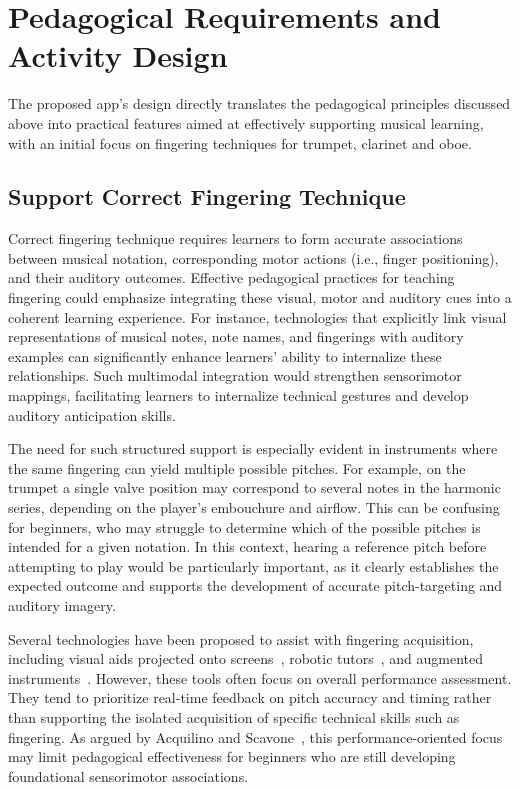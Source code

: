 \documentclass[runningheads]{llncs}
\begin{document}
\section{Pedagogical Requirements and Activity Design}
\label{sec:during}

The proposed app’s design directly translates the pedagogical principles discussed above into practical features aimed at effectively supporting musical learning, with an initial focus on fingering techniques for trumpet, clarinet and oboe.


\subsection{Support Correct Fingering Technique}
\label{sec:fingering}

Correct fingering technique requires learners to form accurate associations between musical notation, corresponding motor actions (i.e., finger positioning), and their auditory outcomes. Effective pedagogical practices for teaching fingering could emphasize integrating these visual, motor and auditory cues into a coherent learning experience.
For instance, technologies that explicitly link visual representations of musical notes, note names, and fingerings with auditory examples can significantly enhance learners’ ability to internalize these relationships. Such multimodal integration would strengthen sensorimotor mappings, facilitating learners to internalize technical gestures and develop auditory anticipation skills.

The need for such structured support is especially evident in instruments where the same fingering can yield multiple possible pitches. For example, on the trumpet a single valve position may correspond to several notes in the harmonic series, depending on the player’s embouchure and airflow. This can be confusing for beginners, who may struggle to determine which of the possible pitches is intended for a given notation. In this context, hearing a reference pitch before attempting to play would be particularly important, as it clearly establishes the expected outcome and supports the development of accurate pitch-targeting and auditory imagery.

Several technologies have been proposed to assist with fingering acquisition, including visual aids projected onto screens~\cite{Yin05}, robotic tutors~\cite{Bagga19}, and augmented instruments~\cite{Li22}. However, these tools often focus on overall performance assessment. They tend to prioritize real-time feedback on pitch accuracy and timing rather than supporting the isolated acquisition of specific technical skills such as fingering. As argued by Acquilino and Scavone~\cite{Acquilino22}, this performance-oriented focus may limit pedagogical effectiveness for beginners who are still developing foundational sensorimotor associations.
\end{document}
